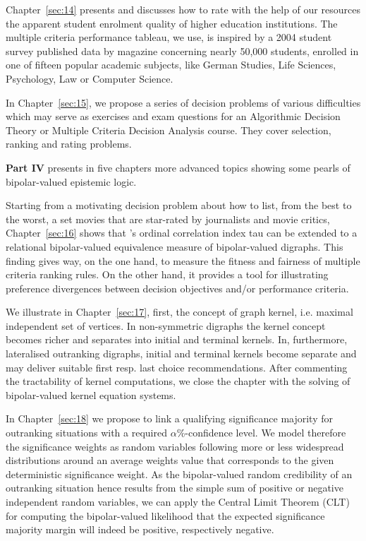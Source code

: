 Chapter~\ref{sec:14} presents and discusses how to rate with the help of our \Digraph resources the apparent student enrolment quality of higher education institutions. The multiple criteria performance tableau, we use, is inspired by a 2004 student survey published data by \Spiegel magazine concerning nearly 50,000 students, enrolled in one of fifteen popular academic subjects, like German Studies, Life Sciences, Psychology, Law or Computer Science.

In Chapter~\ref{sec:15}, we propose a series of decision problems of various difficulties which may serve as exercises and exam questions for an Algorithmic Decision Theory or Multiple Criteria Decision Analysis course. They cover selection, ranking and rating problems.
\vspace{5pt}

\textbf{Part IV} presents in five chapters more advanced topics showing some pearls of bipolar-valued epistemic logic.

Starting from a motivating decision problem about how to list, from the best to the worst, a set movies that are star-rated by journalists and movie critics, Chapter~\ref{sec:16} shows that \Kendall’s ordinal correlation index tau can be extended to a relational bipolar-valued equivalence measure of bipolar-valued digraphs. This finding gives way, on the one hand, to measure the fitness and fairness of multiple criteria ranking rules. On the other hand, it provides a tool for illustrating preference divergences between decision objectives and/or performance criteria.

We illustrate in Chapter~\ref{sec:17}, first, the concept of graph kernel, i.e. maximal independent set of vertices. In non-symmetric digraphs the kernel concept becomes richer and separates into initial and terminal kernels. In, furthermore, lateralised outranking digraphs, initial and terminal kernels become separate and may deliver suitable first resp. last choice recommendations. After commenting the tractability of kernel computations, we close the chapter with the solving of bipolar-valued kernel equation systems.

In Chapter~\ref{sec:18} we propose to link a qualifying significance majority for outranking situations with a required $\alpha\%$-confidence level. We model therefore the significance weights as random variables following more or less widespread distributions around an average weights value that corresponds to the given deterministic significance weight. As the bipolar-valued random credibility of an outranking situation hence results from the simple sum of positive or negative independent random variables, we can apply the Central Limit Theorem (CLT) for computing the bipolar-valued likelihood that the expected significance majority margin will indeed be positive, respectively negative.

